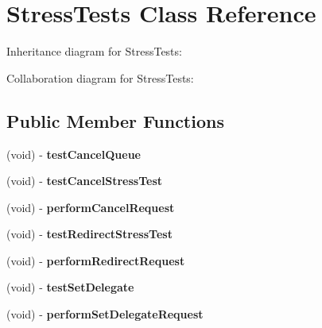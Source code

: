 \hypertarget{interface_stress_tests}{
\section{\-Stress\-Tests \-Class \-Reference}
\label{interface_stress_tests}
}


\-Inheritance diagram for \-Stress\-Tests\-:


\-Collaboration diagram for \-Stress\-Tests\-:
\subsection*{\-Public \-Member \-Functions}
\begin{DoxyCompactItemize}
\item 
\hypertarget{interface_stress_tests_afb60c51a38e60f35f295c41568ebf0dc}{
(void) -\/ {\bfseries test\-Cancel\-Queue}}
\label{interface_stress_tests_afb60c51a38e60f35f295c41568ebf0dc}

\item 
\hypertarget{interface_stress_tests_af8f3f3c9863408513e0d92fdef04f0f4}{
(void) -\/ {\bfseries test\-Cancel\-Stress\-Test}}
\label{interface_stress_tests_af8f3f3c9863408513e0d92fdef04f0f4}

\item 
\hypertarget{interface_stress_tests_ab6c676eea69f75ccfb75de19a502cbcf}{
(void) -\/ {\bfseries perform\-Cancel\-Request}}
\label{interface_stress_tests_ab6c676eea69f75ccfb75de19a502cbcf}

\item 
\hypertarget{interface_stress_tests_a1ab10f6c174bf4e076660f658ecb8acb}{
(void) -\/ {\bfseries test\-Redirect\-Stress\-Test}}
\label{interface_stress_tests_a1ab10f6c174bf4e076660f658ecb8acb}

\item 
\hypertarget{interface_stress_tests_a526debe803d1522f47b63c281626e04d}{
(void) -\/ {\bfseries perform\-Redirect\-Request}}
\label{interface_stress_tests_a526debe803d1522f47b63c281626e04d}

\item 
\hypertarget{interface_stress_tests_a2232ea378810aa470eeef857a8c8a4f9}{
(void) -\/ {\bfseries test\-Set\-Delegate}}
\label{interface_stress_tests_a2232ea378810aa470eeef857a8c8a4f9}

\item 
\hypertarget{interface_stress_tests_a86c6b6b048544a8c8b7b6ed55c5ed78f}{
(void) -\/ {\bfseries perform\-Set\-Delegate\-Request}}
\label{interface_stress_tests_a86c6b6b048544a8c8b7b6ed55c5ed78f}


\end{DoxyCompactItemize}
